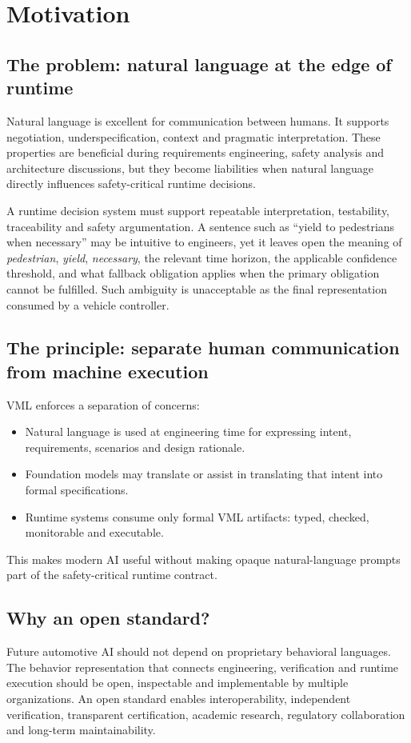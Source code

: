 \documentclass[11pt,a4paper]{article}
\newcommand{\VML}{\textsc{VML}}
\begin{document}
\section{Motivation}
\subsection{The problem: natural language at the edge of runtime}
Natural language is excellent for communication between humans. It supports negotiation, underspecification, context and pragmatic interpretation. These properties are beneficial during requirements engineering, safety analysis and architecture discussions, but they become liabilities when natural language directly influences safety-critical runtime decisions.

A runtime decision system must support repeatable interpretation, testability, traceability and safety argumentation. A sentence such as ``yield to pedestrians when necessary'' may be intuitive to engineers, yet it leaves open the meaning of \emph{pedestrian}, \emph{yield}, \emph{necessary}, the relevant time horizon, the applicable confidence threshold, and what fallback obligation applies when the primary obligation cannot be fulfilled. Such ambiguity is unacceptable as the final representation consumed by a vehicle controller.

\subsection{The principle: separate human communication from machine execution}
\VML{} enforces a separation of concerns:
\begin{itemize}
  \item Natural language is used at engineering time for expressing intent, requirements, scenarios and design rationale.
  \item Foundation models may translate or assist in translating that intent into formal specifications.
  \item Runtime systems consume only formal \VML{} artifacts: typed, checked, monitorable and executable.
\end{itemize}
This makes modern AI useful without making opaque natural-language prompts part of the safety-critical runtime contract.

\subsection{Why an open standard?}
Future automotive AI should not depend on proprietary behavioral languages. The behavior representation that connects engineering, verification and runtime execution should be open, inspectable and implementable by multiple organizations. An open standard enables interoperability, independent verification, transparent certification, academic research, regulatory collaboration and long-term maintainability.
\end{document}
